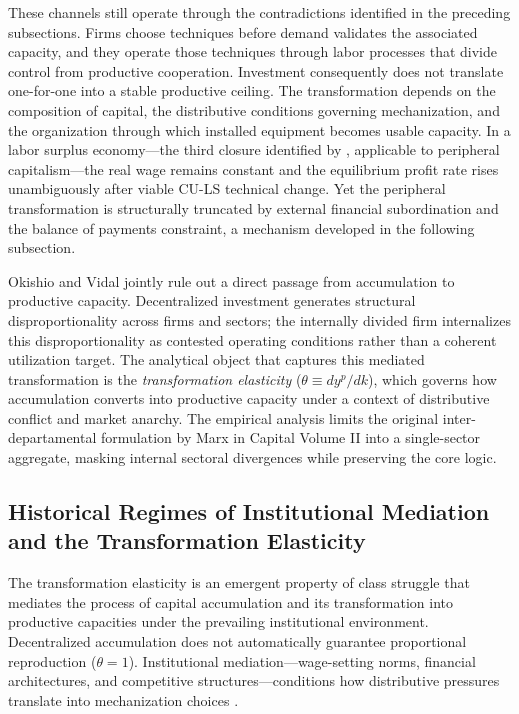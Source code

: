 These channels still operate through the contradictions
identified in the preceding subsections. Firms choose techniques
before demand validates the associated capacity, and they
operate those techniques through labor processes that divide
control from productive cooperation. Investment consequently
does not translate one-for-one into a stable productive ceiling.
The transformation depends on the composition of capital, the
distributive conditions governing mechanization, and the
organization through which installed equipment becomes usable
capacity. In a labor surplus economy---the third closure
identified by \citet{Basu2026}, applicable to peripheral
capitalism---the real wage remains constant and the equilibrium
profit rate rises unambiguously after viable CU-LS technical
change. Yet the peripheral transformation is structurally
truncated by external financial subordination and the balance of
payments constraint, a mechanism developed in the following
subsection.

Okishio and Vidal jointly rule out a direct
passage from accumulation to productive capacity.
Decentralized investment generates structural
disproportionality across firms and sectors; the internally
divided firm internalizes this disproportionality as
contested operating conditions rather than a coherent
utilization target. The analytical object that captures this
mediated transformation is the \textit{transformation elasticity} ($\theta \equiv d y^p / d k$), which governs how
accumulation converts into productive capacity under a context of
distributive conflict and market anarchy. The empirical
analysis limits the original inter-departamental formulation by Marx in Capital Volume II into a
single-sector aggregate, masking internal sectoral
divergences while preserving the core logic.

\subsection{Historical Regimes of Institutional Mediation and the Transformation Elasticity}

The transformation elasticity is an emergent property of class struggle 
that mediates the process of capital accumulation and its transformation 
into productive capacities under the prevailing institutional environment.
Decentralized accumulation does not automatically guarantee
proportional reproduction ($\theta = 1$). Institutional
mediation---wage-setting norms, financial architectures, and
competitive structures---conditions how distributive pressures
translate into mechanization choices
\citep{Aglietta2000}. 

